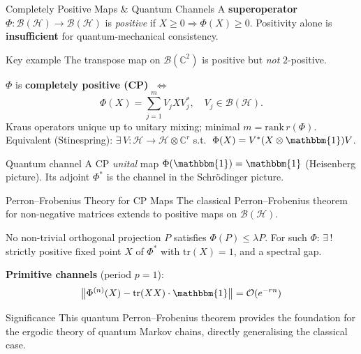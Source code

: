 \documentclass{beamer}
\newcommand{\Hilb}{\mathcal{H}}
\newcommand{\Bound}{\mathcal{B}}
\newcommand{\tr}{\mathrm{tr}}
\begin{document}
\begin{frame}[shrink=10]{Completely Positive Maps \& Quantum Channels}
  A \textbf{superoperator} $\Phi:\Bound(\Hilb)\to\Bound(\Hilb)$ is \emph{positive} if
  $X\ge 0 \Rightarrow \Phi(X)\ge 0$. Positivity alone is \textbf{insufficient} for
  quantum-mechanical consistency.

  \vspace{0.3em}
  \begin{alertblock}{Key example}
    The transpose map on $\Bound(\mathbb C^2)$ is positive but \emph{not} $2$-positive.
  \end{alertblock}

  \begin{tcolorbox}[thmbox={Kraus--Stinespring Theorem}]
    $\Phi$ is \textbf{completely positive (CP)}
    $\;\Longleftrightarrow\;$
    \[
      \Phi(X) = \sum_{j=1}^m V_j X V_j^*, \quad V_j\in\Bound(\Hilb).
    \]
    Kraus operators unique up to unitary mixing; minimal $m = \mathrm{rank}\,r(\Phi)$.
    Equivalent (Stinespring): $\exists\,V:\Hilb\to\Hilb\otimes\mathbb{C}^r$ s.t.\
    $\Phi(X)=V^*(X\otimes\mathbbm{1})V$.
  \end{tcolorbox}

  \begin{block}{Quantum channel}
  \justifying
    A CP \emph{unital} map $\Phi(\mathbbm{1})=\mathbbm{1}$ (Heisenberg picture).
    Its adjoint $\Phi^*$ is the channel in the Schr\"odinger picture.
  \end{block}
\end{frame}

\begin{frame}[shrink=10]{Perron--Frobenius Theory for CP Maps}
  The classical Perron--Frobenius theorem for non-negative matrices extends to positive
  maps on $\Bound(\Hilb)$.

  \vspace{0.3em}
  \begin{tcolorbox}[thmbox={Irreducible CP map}]
    No non-trivial orthogonal projection $P$ satisfies $\Phi(P)\le\lambda P$.
    For such $\Phi$: $\exists\,!$ strictly positive fixed point $X$ of $\Phi^*$ with
    $\tr(X)=1$, and a spectral gap.
  \end{tcolorbox}

  \vspace{0.3em}
  \begin{tcolorbox}[mathbox]
    \textbf{Primitive channels} (period $p=1$):
    \[
      \bigl\|\Phi^{(n)}(X) - \tr(XX)\cdot\mathbbm{1}\bigr\| = \mathcal{O}(e^{-rn})
    \]
  \end{tcolorbox}

  \begin{block}{Significance}
  \justifying
    This quantum Perron--Frobenius theorem provides the foundation for the ergodic
    theory of quantum Markov chains, directly generalising the classical case.
  \end{block}
\end{frame}
\end{document}
